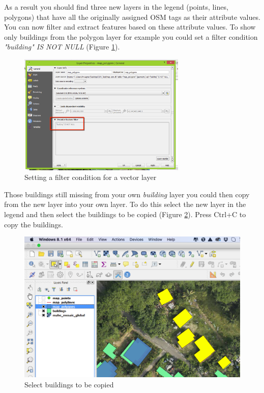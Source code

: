 \documentclass[a4paper,12pt,titlepage]{article}
\begin{document}
 As a result you should find three new layers in the legend (points, lines, polygons) that have all the originally assigned OSM tags as their attribute values. You can now filter and extract features based on these attribute values. To show only buildings from the polygon layer for example you could set a filter condition \textit{"building" IS NOT NULL} (Figure \ref{fig:import_4}).
 
 \begin{figure}[H]
 	\centering
 	\includegraphics[width=8cm]{Images/import_4.png}
 	\caption{Setting a filter condition for a vector layer}\label{fig:import_4}
 \end{figure}
 
Those buildings still missing from your own \textit{building} layer you could then copy from the new layer into your own layer. To do this select the new layer in the legend and then select the buildings to be copied (Figure \ref{fig:import_5}). Press Ctrl+C to copy the buildings.

\begin{figure}[H]
	\centering
	\includegraphics[width=12cm]{Images/import_5.png}
	\caption{Select buildings to be copied}\label{fig:import_5}
\end{figure}
\end{document}
